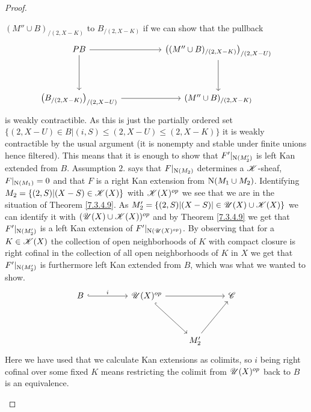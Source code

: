 \documentclass[../../thesis.tex]{subfiles}
\begin{document}
\begin{proof}
\begin{enumerate}[label=(\alph*)]
              $(M''\cup B)_{/(2,X-K)}$ to $B_{/(2,X-K)}$ if we can show that the pullback
              \[\begin{tikzcd}
                      PB && {\left((M''\cup B)_{/(2,X-K)}\right)_{/(2,X-U)}} \\
                      \\
                      {\left(B_{/(2,X-K)}\right)_{/(2,X-U)}} && {(M''\cup B)_{/(2,X-K)}}
                      \arrow[from=1-1, to=1-3]
                      \arrow[from=1-3, to=3-3]
                      \arrow[from=3-1, to=3-3]
                      \arrow[from=1-1, to=3-1]
                  \end{tikzcd}\]
              is weakly contractible.
              As this is just the partially ordered set $\{(2,X-U)\in B | (i,S) \leq (2,X-U) \leq (2,X-K)\}$ it is weakly contractible by the usual argument (it is nonempty and stable under finite unions hence filtered).
              This means that it is enough to show that $F'|_{\mathrm{N}(M_2')}$ is left Kan extended from $B$.
              Assumption $2.$ says that $F|_{\mathrm{N}(M_2)}$ determines a $\mathscr{K}$-sheaf, $F|_{\mathrm{N}(M_1)}=0$ and that $F$ is a right Kan extension from $\mathrm{N}(M_1 \cup M_2)$.
              Identifying $M_2 = \{(2, S) | (X-S) \in \mathscr{K}(X)\}$ with $\mathscr{K}(X)^{op}$ we see that we are in the situation of Theorem \ref{7.3.4.9}.
              As $M_2' = \{(2,S) | (X-S) | \in \mathscr{U}(X) \cup \mathscr{K}(X)\}$ we can identify it with $(\mathscr{U}(X) \cup \mathscr{K}(X))^{op}$ and by Theorem \ref{7.3.4.9} we get that $F'|_{\mathrm{N}(M_2')}$ is a left Kan extension of $F'|_{\mathrm{N}(\mathscr{U}(X)^{op})}$.
              By observing that for a $K \in \mathscr{K}(X)$ the collection of open neighborhoods of $K$ with compact closure is right cofinal in the collection of all open neighborhoods of $K$ in $X$ we get that $F'|_{\mathrm{N}(M_2')}$ is furthermore left Kan extended from $B$, which was what we wanted to show.
              \[\begin{tikzcd}
                      B && {\Open(X)^{op}} && \C \\
                      \\
                      &&& {M_2'}
                      \arrow[hook, from=1-3, to=3-4]
                      \arrow[from=1-3, to=1-5]
                      \arrow[from=3-4, to=1-5]
                      \arrow["i", hook, from=1-1, to=1-3]
                  \end{tikzcd}\]
              Here we have used that we calculate Kan extensions as colimits, so $i$ being right cofinal over some fixed $K$ means restricting the colimit from $\mathscr{U}(X)^{op}$ back to $B$ is an equivalence.

\end{enumerate}
\end{proof}
\end{document}
